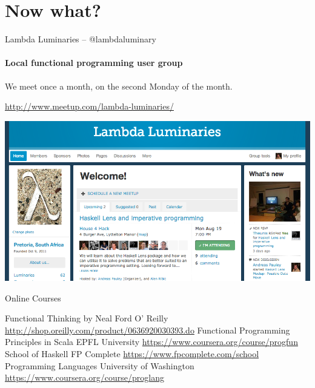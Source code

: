 \documentclass[mathserif]{beamer}
\begin{document}
\section{Now what?}

\begin{frame}{Lambda Luminaries -- @lambdaluminary}
  \framesubtitle{Local functional programming user group}
  We meet once a month, on the second Monday of the month.

  \url{http://www.meetup.com/lambda-luminaries/}
  \begin{center}
    \includegraphics[scale=0.3]{img/LambdaLuminariesScreenShot2013-08-09.png}
  \end{center}
\end{frame}

\begin{frame}{Online Courses}

  \begin{thebibliography}{10}
      Functional Thinking by Neal Ford
      \newblock O' Reilly
      \newblock \url{http://shop.oreilly.com/product/0636920030393.do}
      Functional Programming Principles in Scala
      \newblock EPFL University
      \newblock \url{https://www.coursera.org/course/progfun}
      School of Haskell
      \newblock FP Complete
      \newblock \url{https://www.fpcomplete.com/school}
      Programming Languages
      \newblock University of Washington
      \newblock \url{https://www.coursera.org/course/proglang}
  \end{thebibliography}

\end{frame}
\end{document}
